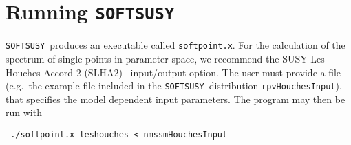 \documentclass[final,3p,times,pdflatex]{elsarticle}
\def\SOFTSUSY{{\tt SOFTSUSY}}
\def\code#1{\small{\tt #1}\normalsize}
\begin{document}
\appendix

\section{Running \SOFTSUSY}
\label{sec:run}

\SOFTSUSY~produces an executable called \code{softpoint.x}. For the calculation
of the spectrum of single points in parameter space, we recommend the
SUSY Les Houches Accord 2 (SLHA2)~\cite{Allanach:2008qq}  input/output
option. The user must provide a file (e.g.\ the example file included
in the \SOFTSUSY~distribution
\code{rpvHouchesInput}), that specifies the model dependent input
parameters. The program may then be run with
\small
\begin{verbatim}
 ./softpoint.x leshouches < nmssmHouchesInput
\end{verbatim}
\normalsize
\end{document}
